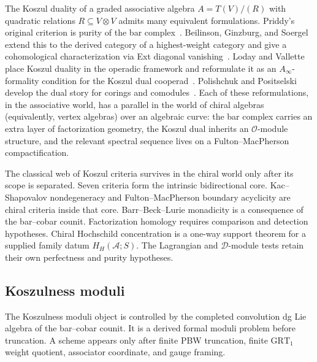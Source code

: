 \documentclass[11pt,reqno]{amsart}
\theoremstyle{definition}
\theoremstyle{remark}
\newcommand{\cA}{\mathcal{A}}
\newcommand{\cD}{\mathcal{D}}
\newcommand{\cO}{\mathcal{O}}
\numberwithin{equation}{section}
\begin{document}
The Koszul duality of a graded associative algebra
$A = T(V)/(R)$ with quadratic relations $R \subseteq V \otimes V$
admits many equivalent formulations.
Priddy's original criterion is purity of the
bar complex~\cite{Priddy}. Beilinson, Ginzburg, and Soergel extend
this to the derived category of a highest-weight category and give
a cohomological characterization via Ext diagonal
vanishing~\cite{BGS}. Loday and Vallette place Koszul duality in
the operadic framework and reformulate it as an
$A_\infty$-formality condition for the Koszul dual
cooperad~\cite{LV12}. Polishchuk and Positselski develop the dual
story for corings and comodules~\cite{PP}. Each of these
reformulations, in the associative world, has a parallel in the
world of chiral algebras (equivalently, vertex algebras) over an
algebraic curve: the bar complex carries an extra layer of
factorization geometry, the Koszul dual inherits an
$\cO$-module structure, and the relevant spectral sequence lives
on a Fulton--MacPherson compactification.

The classical web of Koszul criteria survives in the chiral world
only after its scope is separated. Seven criteria form the
intrinsic bidirectional core. Kac--Shapovalov nondegeneracy and
Fulton--MacPherson boundary acyclicity are chiral criteria inside
that core. Barr--Beck--Lurie monadicity is a consequence of the
bar--cobar counit. Factorization homology requires comparison and
detection hypotheses. Chiral Hochschild concentration is a
one-way support theorem for a supplied family datum $H_H(\cA;S)$.
The Lagrangian and
$\cD$-module tests retain their own perfectness and purity
hypotheses.

\subsection{Koszulness moduli}

The Koszulness moduli object is controlled by the completed
convolution dg Lie algebra of the bar--cobar counit. It is a
derived formal moduli problem before truncation. A scheme appears
only after finite PBW truncation, finite $\mathrm{GRT}_1$ weight
quotient, associator coordinate, and gauge framing.
\end{document}
